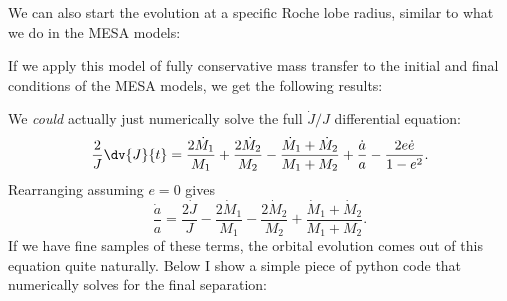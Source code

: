 \documentclass[a4paper,10pt]{article}
\begin{document}
\begin{figure}[ht]
    \centering
\end{figure}
\nextpage

We can also start the evolution at a specific Roche lobe radius, similar to what we do in the MESA models:
\begin{figure}[ht]
    \centering
\end{figure}

If we apply this model of fully conservative mass transfer to the initial and final conditions of the MESA models, we get the following results:
\begin{figure}[ht]
    \centering
\end{figure}

We \emph{could} actually just numerically solve the full \(\dot{J}  / J \) differential equation:
\begin{equation*}
    \frac{2}{J}\dv{J}{t} = \frac{2 \dot{M}_\text{1}}{M_{1}} + \frac{2 \dot{M}_\text{2}}{M_{2}} - \frac{\dot{M}_{1} + \dot{M}_{2}}{M_{1} + M_{2}} + \frac{\dot{a}}{a} -\frac{2 e\dot{e}}{1-e^{2}}.
\end{equation*}
Rearranging assuming \(e = 0\) gives
\begin{equation*}
     \frac{\dot{a}}{a} = \frac{2\dot{J}}{J} - \frac{2 \dot{M}_\text{1}}{M_{1}} - \frac{2 \dot{M}_\text{2}}{M_{2}} + \frac{\dot{M}_{1} + \dot{M}_{2}}{M_{1} + M_{2}}.
\end{equation*}
If we have fine samples of these terms, the orbital evolution comes out of this equation quite naturally. Below I show a simple piece of python code that numerically solves for the final separation:
\end{document}
